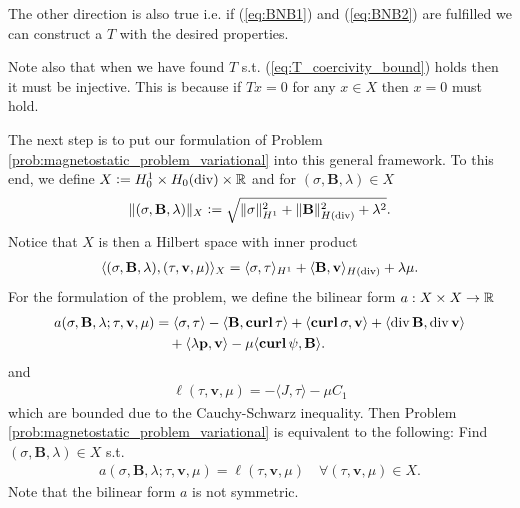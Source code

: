 \documentclass[../master_thesis.tex]{subfiles}
\begin{document}
\begin{remark}
    The other direction is also true i.e. if (\ref{eq:BNB1}) and (\ref{eq:BNB2}) 
    are fulfilled we can construct a $T$ with the desired properties.
\end{remark}

Note also that when we have found $T$ s.t. (\ref{eq:T_coercivity_bound}) holds 
then it must be injective. This is because if $Tx = 0$ for any 
$x \in X$ then $x=0$ must hold.

The next step is to put our formulation of
Problem \ref{prob:magnetostatic_problem_variational} into 
this general framework. To this end, 
we define $X \vcentcolon= H^1_0 \times H_0(\diver) \times \real$
and for $(\sigma, \mathbf{B},\lambda) \in X$
\begin{align*}
    \lVert (\sigma, \mathbf{B}, \lambda) \rVert _X 
    \vcentcolon= \sqrt{\lVert \sigma \rVert^2_{H^1} + \lVert \mathbf{B} \rVert^2_{H(\diver)}
    + \lambda^2}.
\end{align*}
Notice that $X$ is then a Hilbert space with inner product 
\begin{align*}
    \langle (\sigma,\mathbf{B},\lambda), (\tau, \mathbf{v},\mu) \rangle _X 
    = \langle \sigma, \tau \rangle _{H^1} + \langle \mathbf{B}, \mathbf{v} \rangle _{H(\diver)} + \lambda \mu.
\end{align*}
For the formulation of the problem, we define the
bilinear form $a:X\times X \rightarrow \real$
\begin{align}
    a(\sigma,\mathbf{B}, \lambda;\tau,\mathbf{v},\mu) 
    &=   \langle \sigma, \tau \rangle - \langle \mathbf{B}, \veccurl\tau \rangle
        + \langle \veccurl\sigma, \mathbf{v} \rangle + \langle \diver \mathbf{B}, \diver \mathbf{v} \rangle \notag
        \\ &\quad+ \langle \lambda \mathbf{p}, \mathbf{v} \rangle - \mu \langle \veccurl \psi, \mathbf{B} \rangle.
        \label{eq:definition_bilinear_form}
\end{align}
and 
\begin{align*}
    \ell(\tau,\mathbf{v},\mu) = -\langle J, \tau \rangle - \mu C_1
\end{align*}
which are bounded due to the Cauchy-Schwarz inequality.
Then Problem\,\ref{prob:magnetostatic_problem_variational}
is equivalent to the following: Find $(\sigma,\mathbf{B},\lambda) \in 
X$ s.t.
\begin{align*}
    a(\sigma,\mathbf{B},\lambda;\tau,\mathbf{v},\mu) = \ell(\tau,\mathbf{v},\mu)
        \quad \forall (\tau,\mathbf{v},\mu) \in X.
\end{align*}
Note that the bilinear form $a$ is not symmetric. 
\end{document}
